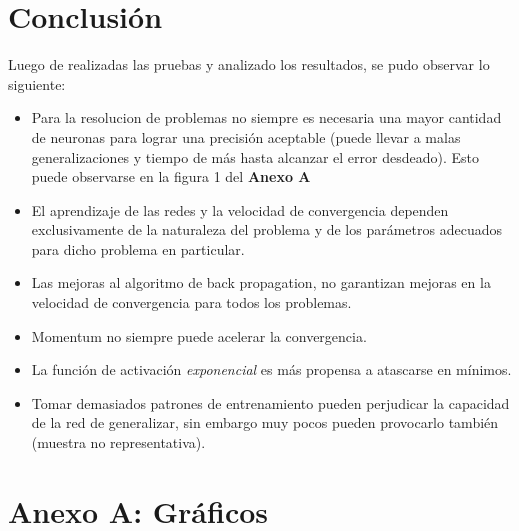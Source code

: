 \documentclass[%
    final,
    reprint,
    notitlepage,
    narroweqnarray,
    inline,
    twoside,
    invited
    ]{ieee}
\begin{document}
\section{Conclusión}

Luego de realizadas las pruebas y analizado los resultados, se pudo observar lo siguiente:\\
\begin{itemize}
\item Para la resolucion de problemas no siempre es necesaria una mayor cantidad de neuronas para 
lograr una precisión aceptable (puede llevar a malas generalizaciones y tiempo de más 
hasta alcanzar el error desdeado). Esto puede observarse en la figura 1 del \textbf{Anexo A}\\
\item El aprendizaje de las redes y la velocidad de convergencia dependen exclusivamente de la naturaleza del problema 
y de los parámetros adecuados para dicho problema en particular.\\
\item Las mejoras al algoritmo de back propagation, no garantizan mejoras en la velocidad de convergencia para 
todos los problemas.\\
\item Momentum no siempre puede acelerar la convergencia.
\item La función de activación \textit{exponencial} es más propensa a atascarse en mínimos.
\item Tomar demasiados patrones de entrenamiento pueden perjudicar la capacidad de la red de generalizar, 
sin embargo muy pocos pueden provocarlo también (muestra no representativa).\\
\end{itemize}




\clearpage
\onecolumn

\section*{Anexo A: Gráficos}
\end{document}
